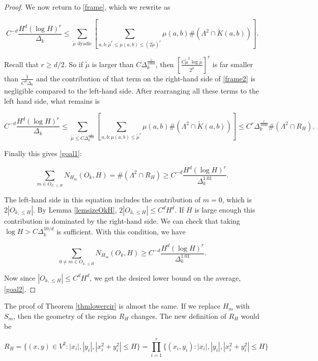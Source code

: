 \documentclass{amsart}
\begin{document}
\begin{proof}
We now return to \eqref{frame}, which we rewrite as

 \begin{equation} \label{frame2} C^{-d} \frac{ H^d (\log H)^r }{\Delta_k} \le \sum_{\tilde \mu \textrm{ dyadic}} \left[  \sum_{a,b : \tilde \mu^r \le \mu(a,b) \le (2 \tilde \mu)^r} \mu(a,b) \# (\Lambda^2 \cap \tilde K(a,b) ) \right]. \end{equation} 
 
Recall that $r \ge d/2$.   So if $\tilde \mu$ is larger than $C \Delta_k^{\frac{1}{100d}}$, then $\left[ \frac{C \tilde \mu^2 \log \tilde \mu}{2^{\tilde \mu}} \right]^r $ is far smaller than $\frac{1}{C^d \Delta_k}$ and the contribution of that term on the right-hand side of \eqref{frame2} is negligible compared to the left-hand side.  After rearranging all these terms to the left hand side, what remains is

 \begin{equation} \label{frame3} C^{-d} \frac{ H^d (\log H)^r }{\Delta_k} \le \sum_{\tilde \mu \le C \Delta_k^{\frac{1}{100d}}} \left[  \sum_{a,b :  \mu(a,b) \le \tilde \mu^r} \mu(a,b) \# (\Lambda^2 \cap \tilde K(a,b) ) \right] \le C^r \Delta_k^{\frac{r}{100d}} \# (\Lambda^2 \cap R_H). \end{equation} 

Finally this gives \eqref{goal1}: 

$$\sum_{m \in O_{k, \le H}} N_{H_m} (O_k, H) =  \# (\Lambda^2 \cap R_H) \ge C^{-d} \frac{H^d (\log H)^r }{\Delta_k^{1.01}}. $$

The left-hand side in this equation includes the contribution of $m=0$, which is $2 |O_{k, \le H}|$.  By Lemma \ref{lemsizeOkH}, $2 |O_{k, \le H}| \le C^d H^d$.  If $H$ is large enough this contribution is dominated by the right-hand side.  We can check that taking $\log H  > C \Delta_k^{10/d}$ is sufficient.  With this condition, we have

$$\sum_{0 \not= m \in O_{k, \le H}} N_{H_m} (O_k, H)  \ge C^{-d} \frac{H^d (\log H)^r }{\Delta_k^{1.01}}. $$

Now since $|O_{k, \le H} | \le C^d H^d$, we get the desired lower bound on the average, \eqref{goal2}.  

\end{proof}

The proof of Theorem \ref{thmlowercir} is almost the same.  If we replace $H_m$ with $S_m$, then the geometry of the region $R_H$ changes.  The new definition of $R_H$ would be

$$ R_H = \{ (x,y) \in V^2: |x_i|, |y_i|, |x_i^2 + y_i^2 | \le H \} = \prod_{i=1}^r \{(x_i, y_i):   |x_i|, |y_i|, |x_i^2 + y_i^2 | \le H \}$$
\end{document}
